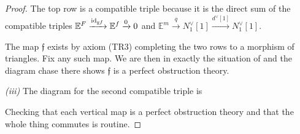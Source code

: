 \documentclass[12pt,dvipsnames]{amsart}
\begin{document}
\begin{proof}
  The top row is a compatible triple because it is the direct sum of the compatible triples \(\mathbb E^F\xrightarrow{\operatorname{id}_{\mathbb E^f}} \mathbb E^f \xrightarrow{0}0\) and \(\mathbb E^m \xrightarrow{q} N_1^\vee[1] \xrightarrow{d^\vee[1]} N_1^\vee[1]\).

  The map \(\mathfrak f\) exists by axiom (TR3) completing the two rows to a morphism of triangles. Fix any such map. We are then in exactly the situation of \cite[Construction 3.13]{manolache_VirtualPullbacks2012} and the diagram chase there shows \(\mathfrak f\) is a perfect obstruction theory.

  \bigskip
  
  \noindent \emph{(iii)} \quad The diagram for the second compatible triple is
  \begin{center}
  \end{center}
  Checking that each vertical map is a perfect obstruction theory and that the whole thing commutes is routine.
\end{proof}
\end{document}
